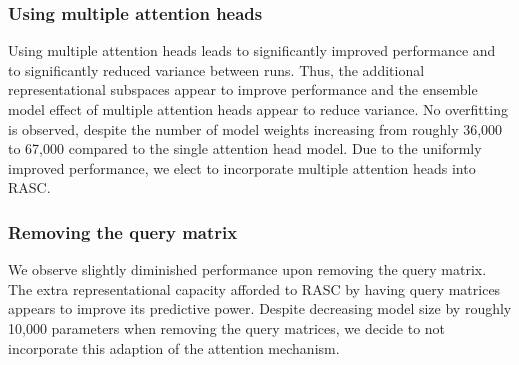 %
\subsubsection{Using multiple attention heads} \label{subsubsec:result_heads}
Using multiple attention heads leads to significantly improved performance and to significantly reduced variance between runs. Thus, the additional representational subspaces appear to improve performance and the ensemble model effect of multiple attention heads appear to reduce variance. No overfitting is observed, despite the number of model weights increasing from roughly 36,000 to 67,000 compared to the single attention head model. Due to the uniformly improved performance, we elect to incorporate multiple attention heads into RASC. 


\subsubsection{Removing the query matrix}  %
We observe slightly diminished performance upon removing the query matrix. The extra representational capacity afforded to RASC by having query matrices appears to improve its predictive power. Despite decreasing model size by roughly 10,000 parameters when removing the query matrices, we decide to not incorporate this adaption of the attention mechanism. 

